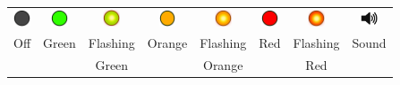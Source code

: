 \documentclass[12pt, a4paper]{report}
\begin{document}
\begin{tabular}{c c c c c c c c}
	\includegraphics*[width=5mm]{off_led} & \includegraphics*[width=5mm]{green_led} & \includegraphics*[width=5mm]{green_led_flashing} & \includegraphics*[width=5mm]{orange_led} & \includegraphics*[width=5mm]{orange_led_flashing} & \includegraphics*[width=5mm]{red_led} & \includegraphics*[width=5mm]{red_led_flashing} &
	\includegraphics*[width=5mm]{speaker} \\
	Off & Green & Flashing & Orange & Flashing & Red & Flashing & Sound\\
	&& Green && Orange && Red & \\

\end{tabular}
\end{document}
